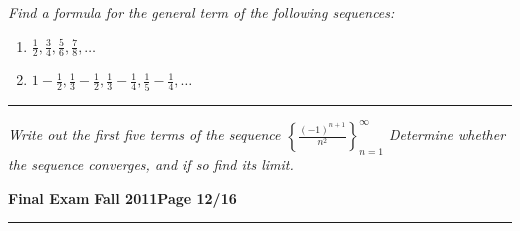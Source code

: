 \documentclass[12pt]{article}
\begin{document}
{\bigskip
{\problem[10 pts] \em  Find a formula for the general term of the following sequences:} 
\begin{enumerate}
\item $\displaystyle{\frac{1}{2}, \frac{3}{4}, \frac{5}{6}, \frac{7}{8}, \dotsc}$
\bigskip
\begin{flushright}
\end{flushright}
\item $\displaystyle{1-\frac{1}{2}, \frac{1}{3} - \frac{1}{2}, \frac{1}{3} - \frac{1}{4}, \frac{1}{5}-\frac{1}{4}, \dotsc}$
\vspace{3cm}
\begin{flushright}
\end{flushright}
\end{enumerate}
\hrule
{\problem[10pts] \em Write out the first five terms of the sequence $\left\{ \displaystyle{\frac{(-1)^{n+1}}{n^2}} \right\}_{n=1}^\infty$ \newline Determine whether the sequence converges, and if so find its limit.
\vspace{7cm}
\begin{flushright}
\end{flushright}
\newpage


\hfill{\large\bf Final Exam}\hfill{\large\bf
  Fall 2011}\hfill{\large\bf Page 12/16}\hrule

}}
\end{document}
